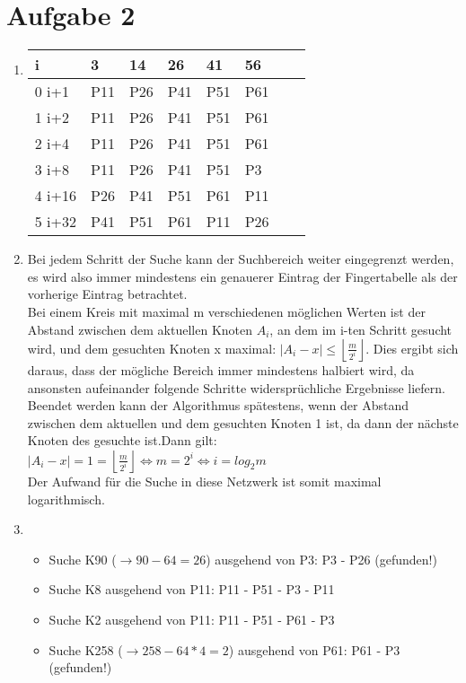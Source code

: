 \documentclass[a4paper]{article}
\begin{document}
\section*{Aufgabe 2}
\begin{enumerate}[label=\alph*)]
\item 
\begin{tabular}{| l | l | l | l | l | l | l | l |}
\hline 
i & 3 & 14 & 26 & 41 & 56\\
\hline
\hline
0 i+1 & P11 & P26 & P41 & P51 & P61\\
1 i+2 & P11 & P26 & P41 & P51 & P61\\
2 i+4 & P11 & P26 & P41 & P51 & P61\\
3 i+8 & P11 & P26 & P41 & P51 & P3\\
4 i+16 & P26 & P41 & P51 & P61 & P11\\
5 i+32 & P41 & P51 & P61 & P11 & P26\\
\hline
\end{tabular}

\item 
Bei jedem Schritt der Suche kann der Suchbereich weiter eingegrenzt werden, es wird also immer mindestens ein genauerer Eintrag der Fingertabelle als der vorherige Eintrag betrachtet. \\
Bei einem Kreis mit maximal m verschiedenen möglichen Werten ist der Abstand zwischen dem aktuellen Knoten $ A_i $, an dem im i-ten Schritt gesucht wird, und dem gesuchten Knoten x maximal: $ \vert A_i-x \vert \leq \left\lfloor \frac{m}{2^i} \right\rfloor $. Dies ergibt sich daraus, dass der mögliche Bereich immer mindestens halbiert wird, da ansonsten aufeinander folgende Schritte widersprüchliche Ergebnisse liefern. \\
Beendet werden kann der Algorithmus spätestens, wenn der Abstand zwischen dem aktuellen und dem gesuchten Knoten 1 ist, da dann der nächste Knoten des gesuchte ist.Dann gilt: $ \vert A_i-x \vert = 1 = \left\lfloor \frac{m}{2^i} \right\rfloor \Leftrightarrow m = 2^i \Leftrightarrow i = log_2 m $\\
Der Aufwand für die Suche in diese Netzwerk ist somit maximal logarithmisch.

\item 
\begin{itemize}
\item Suche K90 ($ \rightarrow 90-64 = 26 $) ausgehend von P3: P3 - P26 (gefunden!) 
\item Suche K8 ausgehend von P11: P11 - P51 - P3 - P11
\item Suche K2 ausgehend von P11: P11 - P51 - P61 - P3
\item Suche K258 ($ \rightarrow 258-64*4 = 2 $) ausgehend von P61: P61 - P3 (gefunden!) 
\end{itemize}


\end{enumerate}
\end{document}
